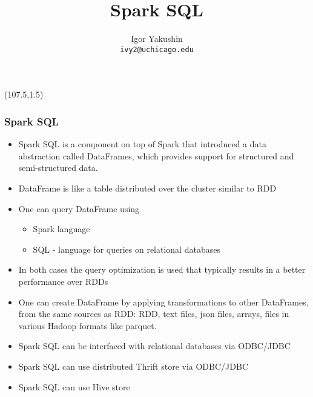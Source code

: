 \documentclass{beamer}
\title{\huge{Spark SQL}}
\author{Igor Yakushin \\ \texttt{ivy2@uchicago.edu}}
\date{}
\newcommand{\SPARK}{
\begin{textblock}{14}(107.5,1.5)
  \pgfuseimage{spark}
\end{textblock}
}
\begin{document}



\begin{frame}
\SPARK
\titlepage
\end{frame}

\begin{frame}[fragile]
  \frametitle{Spark SQL}
  
  \begin{itemize}
  \item {\color{mycolordef}Spark SQL} is a component on top of Spark that introduced a data abstraction called {\color{mycolordef}DataFrames}, which provides support for structured and semi-structured data. 
  \item DataFrame is like a table distributed over the cluster similar to RDD
  \item One can query DataFrame using 
    \begin{itemize}
    \item Spark language
    \item SQL - language for queries on relational databases
    \end{itemize}
  \item In both cases the query optimization is used that typically results in a better performance over RDDs
  \item One can create DataFrame by applying transformations to other DataFrames, from the same sources as RDD: RDD, text files, json files, arrays, files in various Hadoop formats like parquet.
  \item Spark SQL can be interfaced with relational databases via ODBC/JDBC
  \item Spark SQL can use distributed Thrift store via ODBC/JDBC
  \item Spark SQL can use Hive store
  \end{itemize}
\end{frame}
\end{document}

